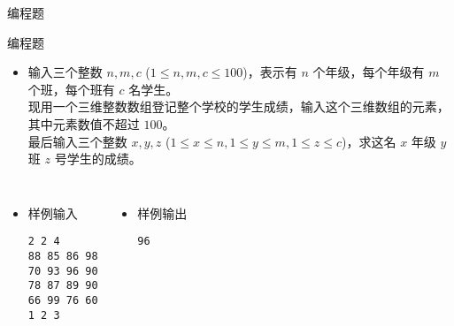 \begin{frame}[fragile]
{{\begin{exampleblock}{编程题}
            \end{exampleblock}
        }{
            
        }
    }{
        \begin{exampleblock}{编程题}

            \begin{itemize}
                \item 输入三个整数 $n, m, c$ ($1 \le n, m, c \le 100$)，表示有 $n$ 个年级，每个年级有 $m$ 个班，每个班有 $c$ 名学生。\\
                    现用一个三维整数数组登记整个学校的学生成绩，输入这个三维数组的元素，其中元素数值不超过 $100$。\\
                    最后输入三个整数 $x, y, z$  ($1 \le x \le n, 1 \le y \le m, 1 \le z \le c$)，求这名 $x$ 年级 $y$ 班 $z$ 号学生的成绩。
            \end{itemize}

            \begin{columns}[onlytextwidth,T]
                \begin{itemize}
                    \item 样例输入

                        \lstinline|2 2 4|\\
                        \lstinline|88 85 86 98|\\
                        \lstinline|70 93 96 90|\\
                        \lstinline|78 87 89 90|\\
                        \lstinline|66 99 76 60|\\
                        \lstinline|1 2 3|\\
                \end{itemize}

                \begin{itemize}
                    \item 样例输出

                        \lstinline|96|
                \end{itemize}
            \end{columns}

        \end{exampleblock}
    }
\end{frame}

